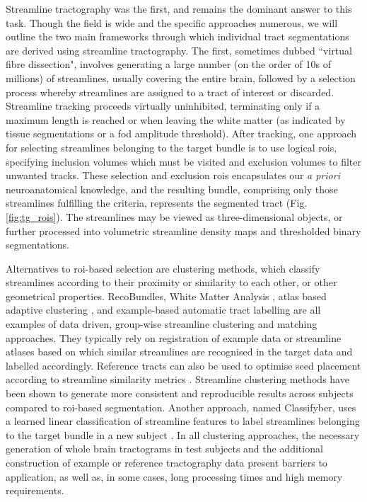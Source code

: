 Streamline tractography was the first, and remains the dominant answer to this task.
Though the field is wide and the specific approaches numerous, we will outline the two main frameworks through which individual tract segmentations are derived using streamline tractography.
The first, sometimes dubbed ``virtual fibre dissection", involves generating a large number (on the order of 10s of millions) of streamlines, usually covering the entire brain, followed by a selection process whereby streamlines are assigned to a tract of interest or discarded.
Streamline tracking proceeds virtually uninhibited, terminating only if a maximum length is reached or when leaving the white matter (as indicated by tissue segmentations\autocite{Smith2012} or a \gls{fod} amplitude threshold).
After tracking, one approach for selecting streamlines belonging to the target bundle is to use logical \glspl{roi}, specifying inclusion volumes which must be visited and exclusion volumes to filter unwanted tracks.
These selection and exclusion \glspl{roi} encapsulates our \textit{a priori} neuroanatomical knowledge, and the resulting bundle, comprising only those streamlines fulfilling the criteria, represents the segmented tract (Fig. \ref{fig:tg_rois}).
The streamlines may be viewed as three-dimensional objects, or further processed into volumetric streamline density maps\autocite{Calamante2010} and thresholded binary segmentations.

Alternatives to \gls{roi}-based selection are clustering methods, which classify streamlines according to their proximity or similarity to each other, or other geometrical properties.
RecoBundles\autocite{Garyfallidis2018}, White Matter Analysis \autocite{ODonnell2017, ODonnell2007}, atlas based adaptive clustering \autocite{Tunc2014}, and example-based automatic tract labelling \autocite{Yoo2015} are all examples of data driven, group-wise streamline clustering and matching approaches.
They typically rely on registration of example data or streamline atlases based on which similar streamlines are recognised in the target data and labelled accordingly.
Reference tracts can also be used to optimise seed placement according to streamline similarity metrics \autocite{Clayden2006,Clayden2009}.
Streamline clustering methods have been shown to generate more consistent and reproducible results across subjects compared to \gls{roi}-based segmentation\autocite{Sydnor2018}.
Another approach, named Classifyber, uses a learned linear classification of streamline features to label streamlines belonging to the target bundle in a new subject \autocite{Berto2021}.
In all clustering approaches, the necessary generation of whole brain tractograms in test subjects and the additional construction of example or reference tractography data present barriers to application, as well as, in some cases, long processing times and high memory requirements\autocite{Wasserthal2018}.

